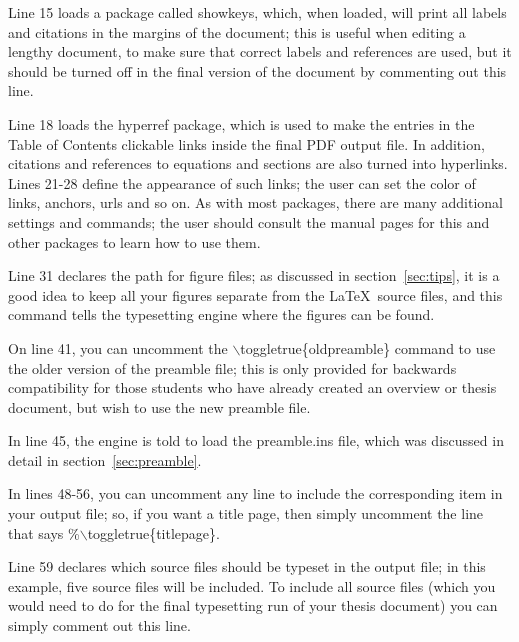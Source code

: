 \documentclass[DIV=calc, paper=letter, fontsize=11pt]{scrartcl}	 %
\newcommand{\la}[2]{\textsf{$\backslash$#1}\{#2\}}
\begin{document}
Line 15 loads a package called \textsf{showkeys}, which, when loaded, will print all labels and citations in the margins
of the document; this is useful when editing a lengthy document, to make sure that correct labels and references are
used, but it should be turned off in the final version of the document by commenting out this line.

Line 18 loads the \textsf{hyperref} package, which is used to make the entries in the Table of Contents clickable links inside
the final PDF output file.  In addition, citations and references to equations and sections are also turned into hyperlinks.
Lines 21-28 define the appearance of such links; the user can set the color of links, anchors, urls and so on.  As with
most packages, there are many additional settings and commands; the user should consult the manual pages for this
and other packages to learn how to use them.

Line 31 declares the path for figure files; as discussed in section~\ref{sec:tips}, it is a good idea to keep all your figures
separate from the \LaTeX\ source files, and this command tells the typesetting engine where the figures can be found.

On line 41, you can uncomment the \la{toggletrue}{oldpreamble} command to use the older version of the preamble file;
this is only provided for backwards compatibility for those students who have already created an overview or thesis document,
but wish to use the new preamble file.  

In line 45, the engine is told to load the \textsf{preamble.ins} file, which was discussed in detail in section~\ref{sec:preamble}.

In lines 48-56, you can uncomment any line to include the corresponding item in your output file; so, if you want a title page,
then simply uncomment the line that says \%\la{toggletrue}{titlepage}.

Line 59 declares which source files should be typeset in the output file; in this example, five source files will be included.
To include all source files (which you would need to do for the final typesetting run of your thesis document) you can simply
comment out this line.
\end{document}
